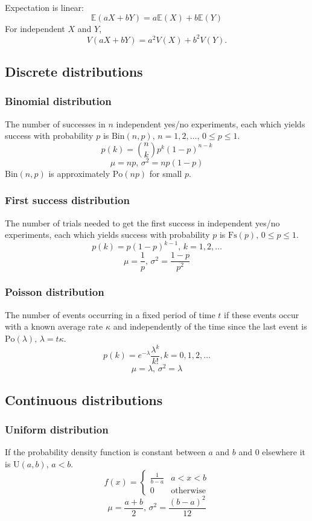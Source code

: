 Expectation is linear:
\[
    \mathbb{E}(aX+bY) = a\mathbb{E}(X)+b\mathbb{E}(Y)
\]
For independent $X$ and $Y$, 
\[
    V(aX+bY) = a^2V(X)+b^2V(Y).
\]

\subsection{Discrete distributions}

\subsubsection{Binomial distribution}
The number of successes in $n$ independent yes/no experiments, each which yields success with probability $p$ is $\textrm{Bin}(n,p),\,n=1,2,\dots,\, 0\leq p\leq1$.
\[
    p(k)=\binom{n}{k}p^k(1-p)^{n-k}
\]
\[
    \mu = np,\,\sigma^2=np(1-p)
\]
$\textrm{Bin}(n,p)$ is approximately $\textrm{Po}(np)$ for small $p$.

\subsubsection{First success distribution}
The number of trials needed to get the first success in independent yes/no experiments, each which yields success with probability $p$ is $\textrm{Fs}(p),\,0\leq p\leq1$.
\[
    p(k)=p(1-p)^{k-1},\,k=1,2,\dots
\]
\[
    \mu = \frac1p,\,\sigma^2=\frac{1-p}{p^2}
\]

\subsubsection{Poisson distribution}
The number of events occurring in a fixed period of time $t$ if these events occur with a known average rate $\kappa$ and independently of the time since the last event is $\textrm{Po}(\lambda),\,\lambda=t\kappa$.
\[
    p(k)=e^{-\lambda}\frac{\lambda^k}{k!}, k=0,1,2,\dots
\]
\[
    \mu=\lambda,\,\sigma^2=\lambda
\]

\subsection{Continuous distributions}

\subsubsection{Uniform distribution}
If the probability density function is constant between $a$ and $b$ and 0 elsewhere it is $\textrm{U}(a,b),\,a<b$.
\[
    f(x) = \left\{
    \begin{array}{cl}
        \frac{1}{b-a} & a<x<b\\
        0 & \textrm{otherwise}
    \end{array}\right.
\]
\[
    \mu=\frac{a+b}{2},\,\sigma^2=\frac{(b-a)^2}{12}
\]

